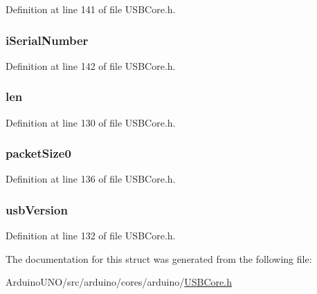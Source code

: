 Definition at line 141 of file U\+S\+B\+Core.\+h.

\hypertarget{struct_device_descriptor_ad5cf25949929f3baddc6f1b2751835dc}{}
\subsubsection[{i\+Serial\+Number}]{ i\+Serial\+Number}\label{struct_device_descriptor_ad5cf25949929f3baddc6f1b2751835dc}


Definition at line 142 of file U\+S\+B\+Core.\+h.

\hypertarget{struct_device_descriptor_afbf3f3230446569534d5f466aaf4c23b}{}
\subsubsection[{len}]{ len}\label{struct_device_descriptor_afbf3f3230446569534d5f466aaf4c23b}


Definition at line 130 of file U\+S\+B\+Core.\+h.

\hypertarget{struct_device_descriptor_a8ccac084f7a6348f5719d6081fcc044e}{}
\subsubsection[{packet\+Size0}]{ packet\+Size0}\label{struct_device_descriptor_a8ccac084f7a6348f5719d6081fcc044e}


Definition at line 136 of file U\+S\+B\+Core.\+h.

\hypertarget{struct_device_descriptor_a0d9dca86e0ffcd6d89828e4b8b0eb8a0}{}
\subsubsection[{usb\+Version}]{ usb\+Version}\label{struct_device_descriptor_a0d9dca86e0ffcd6d89828e4b8b0eb8a0}


Definition at line 132 of file U\+S\+B\+Core.\+h.



The documentation for this struct was generated from the following file\+:\begin{DoxyCompactItemize}
\item 
Arduino\+U\+N\+O/src/arduino/cores/arduino/\hyperlink{_u_s_b_core_8h}{U\+S\+B\+Core.\+h}\end{DoxyCompactItemize}
